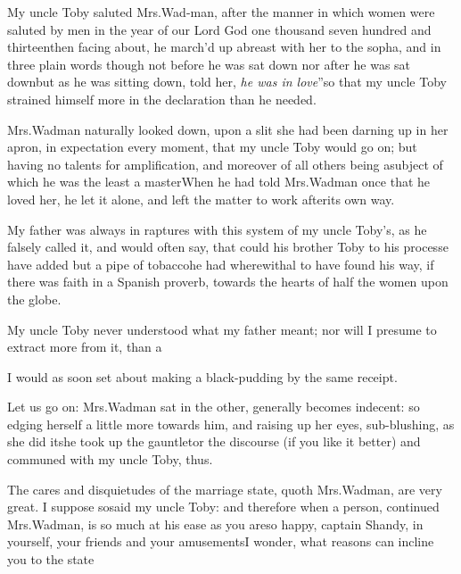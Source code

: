 \documentclass[twoside]{article}
\begin{document}
My uncle Toby saluted Mrs.\@ Wad-\break man, after the
manner in which women were saluted by men in the year of our Lord
God one thousand seven hundred and thirteen\tsh then
facing about, he march’d up abreast with her to the sopha,
and in three plain words\tsk\tsk\break 
though not before he was sat down\tsh\break
nor after he was sat down\tsh\break but as he
was sitting down, told her,\break 
\lqq \textit{he was in love}”\tsh so that my uncle Toby strained
himself more in the declaration than he needed.

Mrs.\@ Wadman naturally looked down, upon a slit she had
been darning up in her apron, in expectation every moment, that my
uncle Toby would go on; but having no talents for
amplification, and  moreover of all others being a\break subject of
which he was the least a master\tsh When he had told 
Mrs.\@ Wadman once that he loved her, he let it alone, and left the
matter to work after\break its own way.

My father was always in raptures with this system of my uncle
Toby’s, as he falsely called it, and would often say,
that could his brother Toby to his processe have added but a
pipe of tobacco\tsh \break he had wherewithal to have found his
way, if there was faith in a Spanish proverb, towards the
hearts of half the women upon the globe.

My uncle Toby never understood what my father meant; nor
will I presume to extract more from it, than a\break
{}

\tsh I would as soon set about\break
making a black-pudding by the same\break
receipt.

Let us go on: Mrs.\@ Wadman sat in\break
{} 
the other, generally becomes
indecent: so edging herself a little more towards him, and raising
up her eyes, sub-blushing, as she did it\tsh she took up
the gauntlet\tsh or the discourse (if you like it better)
and communed with my uncle Toby, thus.

The cares and disquietudes of the marriage state, quoth Mrs.\@ Wadman, are very
great. I suppose so\tsk said my uncle Toby: and therefore when a person, continued
Mrs.\@ Wadman, is so much at his ease as you are\tsk so happy, captain
Shandy, in yourself, your friends and your amusements\tsk I wonder, what
reasons can incline you to the state\tsh
\end{document}
